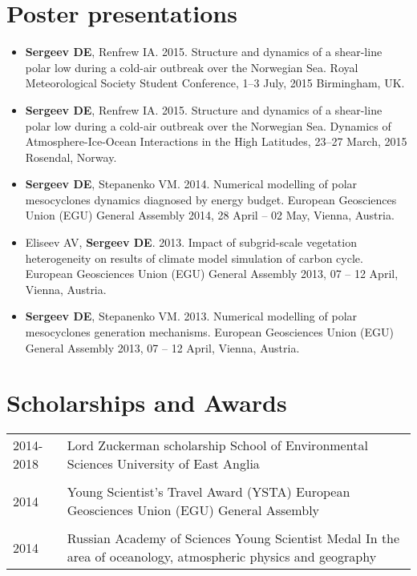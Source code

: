\documentclass[a4paper,11pt]{article}
\newlength{\mycol}
\begin{document}
\section{Poster presentations}
\begin{itemize}
	\item {\bf Sergeev DE}, Renfrew IA. 2015. Structure and dynamics of a shear-line polar low during a cold-air outbreak over the Norwegian Sea. Royal Meteorological Society Student Conference, 1--3 July, 2015 Birmingham, UK.
    \item {\bf Sergeev DE}, Renfrew IA. 2015. Structure and dynamics of a shear-line polar low during a cold-air outbreak over the Norwegian Sea. Dynamics of Atmosphere-Ice-Ocean Interactions in the High Latitudes, 23--27 March, 2015 Rosendal, Norway.
	\item {\bf Sergeev DE}, Stepanenko VM. 2014. Numerical modelling of polar mesocyclones dynamics diagnosed by energy budget. European Geosciences Union (EGU) General Assembly 2014, 28 April -- 02 May, Vienna, Austria.
	\item Eliseev AV, {\bf Sergeev DE}. 2013. Impact of subgrid-scale vegetation heterogeneity on results of climate model simulation of carbon cycle. European Geosciences Union (EGU) General Assembly 2013, 07 -- 12 April, Vienna, Austria.
	\item {\bf Sergeev DE}, Stepanenko VM. 2013. Numerical modelling of polar mesocyclones generation mechanisms. European Geosciences Union (EGU) General Assembly 2013, 07 -- 12 April, Vienna, Austria.
\end{itemize}

      
\section{Scholarships and Awards}
\begin{tabu} to 	
 \textsc{2014-2018} & Lord Zuckerman scholarship
                    \newline School of Environmental Sciences
                    \newline University of East Anglia \\
  \\
 \textsc{2014} & Young Scientist's Travel Award (YSTA)
                 \newline European Geosciences Union (EGU) General Assembly \\
  \\
 \textsc{2014} & Russian Academy of Sciences Young Scientist Medal
                 \newline In the area of oceanology, atmospheric physics and geography
\end{tabu}
\end{document}
